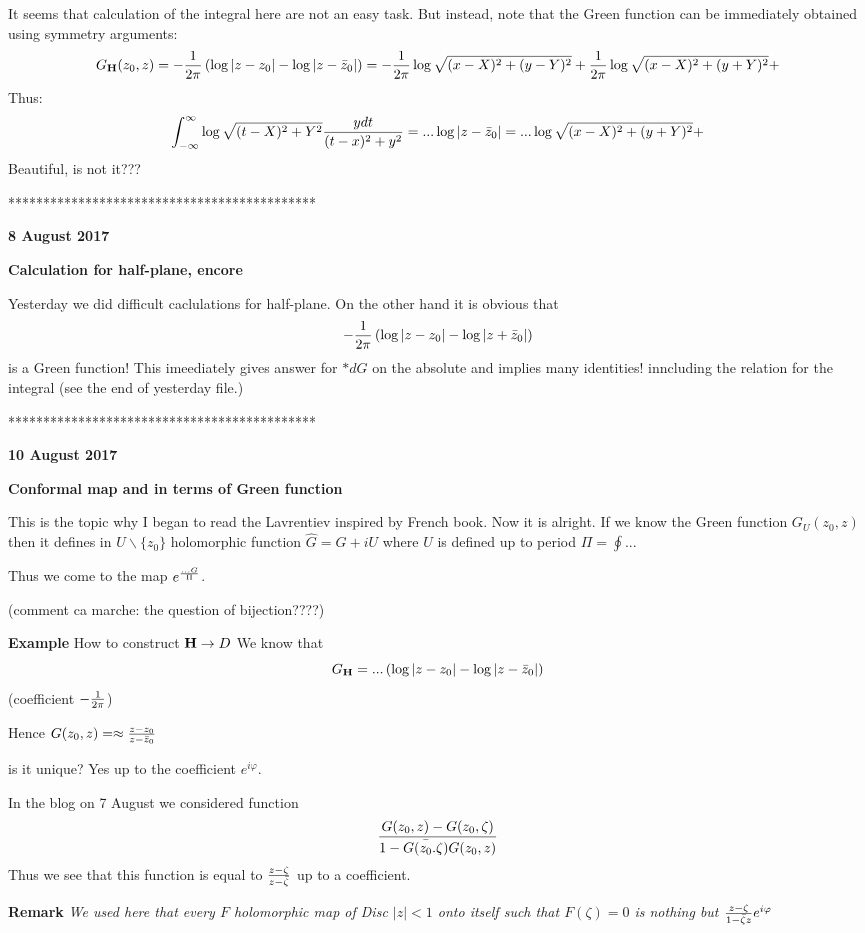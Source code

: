 It seems that calculation of the integral here are not  an easy task.
But instead,  note that the Green function can be immediately
    obtained using symmetry arguments:
         $$
  G_{\bf H}(z_0,z)=-{1\over 2\pi}\left(\log|z-z_0|-\log|z-\bar z_0|\right)=
     -{1\over 2\pi}\log\sqrt {(x-X)^2+(y-Y)^2}+
    {1\over 2\pi}\log\sqrt {(x-X)^2+(y+Y)^2}+
            $$
Thus:
                      $$      
   \int_{-\infty}^{\infty}\log\sqrt {(t-X)^2+Y^2}
   {ydt\over (t-x)^2+y^2}=
  ...\log|z-\bar z_0|=
    ...\log\sqrt {(x-X)^2+(y+Y)^2}+
                     $$
Beautiful, is not it???

********************************************

\bigskip

\centerline  {\bf 8 August  2017}

\centerline {\bf Calculation for half-plane, encore}

  Yesterday we did difficult caclulations for
half-plane. On the other hand it is obvious that
     $$
-{1\over 2\pi}\left(\log|z-z_0|-\log|z+\bar z_0|\right)
     $$
is a Green function!
This imeediately gives answer
for $*dG$ on the absolute and implies
many identities!
 inncluding the relation for the integral (see the end of yesterday file.)


********************************************

\bigskip

\centerline  {\bf 10 August  2017}


   {\bf Conformal map and
in terms of Green function}

  This is the topic why I began to read the Lavrentiev inspired
by French book. Now it is alright.
   If we know the Green function $G_U(z_0,z)$  
 then it defines in  $U\backslash \{z_0\}$ holomorphic function
$\hat G=G+iU$ where $U$ 
is defined up to period  $\Pi=\oint...$

Thus we come to  the map $e^{...G\over \Pi}$.

\m

  (comment ca marche: the question of bijection????)

\m

  {\bf Example}  How to construct ${\bf H}\to D$
We know that
             $$
  G_{\bf H}=...\left(\log|z-z_0|-\log|z-\bar z_0|\right)
             $$
(coefficient $-{1\over 2\pi}$)

  Hence  $G(z_0,z)=\approx {z-z_0\over z-\bar z_0}$

is it unique? Yes up to the coefficient $e^{i\varphi}$. 

 In  the blog on 7 August
we considered function
       $$
    {G(z_0,z)-G(z_0,\zeta)\over 1-\bar{G(z_0.\zeta)} 
G(z_0,z)}
       $$
Thus we see that this function is equal to
      $z-\zeta\over z-\bar\zeta$ up to a coefficient.

{\bf Remark} { \it We used here that every $F$ holomorphic map
of Disc $|z|<1$ onto itself such that $F(\zeta)=0$ 
is nothing but
${z-\zeta\over 1-\bar\zeta z}e^{i\varphi}$ }



\bye
